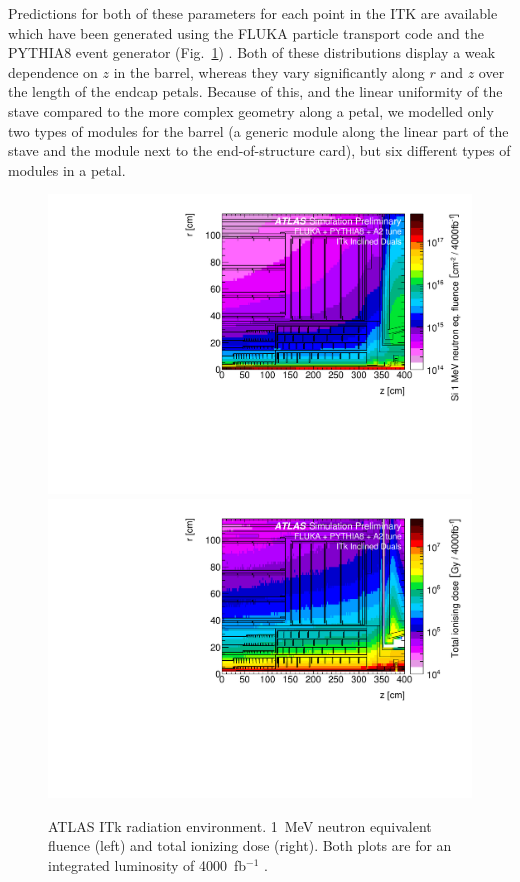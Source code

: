 Predictions for both of these parameters for each point in the ITK are available which have been generated using the FLUKA particle transport code and the PYTHIA8 event generator (Fig.~\ref{fig:radiation}) \cite{background}. Both of these distributions display a weak dependence on $z$ in the barrel, whereas they vary significantly along $r$ and $z$ over the length of the endcap petals. Because of this, and the linear uniformity of the stave compared to the more complex geometry along a petal, we modelled only two types of modules for the barrel (a generic module along the linear part of the stave and the module next to the end-of-structure card), but six different types of modules in a petal.

\begin{figure}[ht]
\centering
\includegraphics[width=0.48\linewidth]{figures/fluence.pdf}\quad
\includegraphics[width=0.48\linewidth]{figures/TID.pdf}
\caption{ATLAS ITk radiation environment. 1~MeV neutron equivalent fluence (left) and total ionizing dose (right). Both plots are for an integrated luminosity of 4000~fb$^{-1}$ \cite{background}.}
\label{fig:radiation}
\end{figure}
